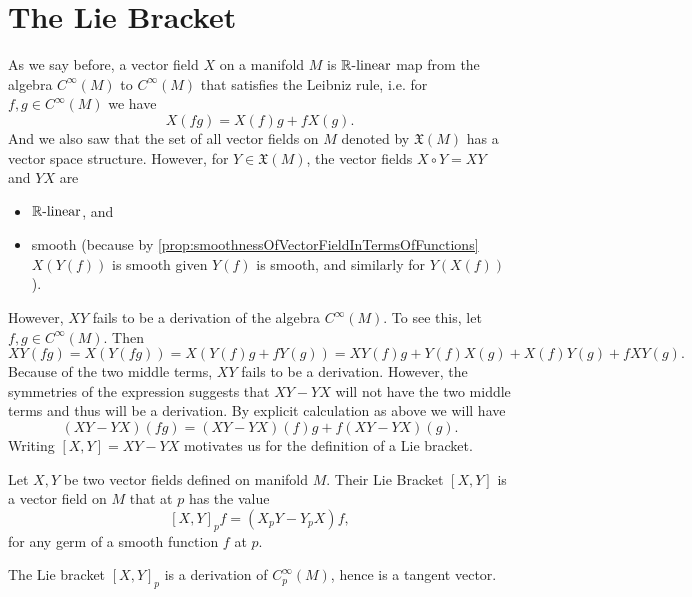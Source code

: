 \section{The Lie Bracket}
As we say before, a vector field $ X $ on a manifold $ M $ is $ \mathbb{R}\text{-linear} $ map from the algebra $ C^\infty(M) $ to $ C^\infty(M) $ that satisfies the Leibniz rule, i.e. for $ f,g \in C^\infty(M) $ we have
\[ X(fg) = X(f)g + fX(g). \]
And we also saw that the set of all vector fields on $  M $ denoted by $ \mathfrak{X}(M) $ has a vector space structure. However, for $ Y \in \mathfrak{X}(M) $, the vector fields $ X\circ Y  = XY $ and $ YX $ are
\begin{itemize}
	\item $ \mathbb{R}\text{-linear} $, and
	\item smooth (because by \autoref{prop:smoothnessOfVectorFieldInTermsOfFunctions} $ X(Y(f)) $ is smooth given $ Y(f) $ is smooth, and similarly for $ Y(X(f)) $).
\end{itemize}
However, $ XY $ fails to be a derivation of the algebra $ C^\infty(M) $. To see this, let $ f,g \in C^\infty (M) $. Then 
\[ XY(fg) = X(Y(fg)) = X(Y(f)g + fY(g)) = XY(f)g + Y(f)X(g) + X(f)Y(g) + fXY(g). \]
Because of the two middle terms, $ XY $ fails to be a derivation. However, the symmetries of the expression suggests that $ XY - YX $ will not have the two middle terms and thus will be a derivation. By explicit calculation as above we will have
\[ (XY - YX)(fg) = (XY - YX)(f) g + f(XY - YX)(g).  \]
Writing $ [X,Y] = XY - YX $ motivates us for the definition of a Lie bracket.

\begin{definition}
	Let $ X,Y $ be two vector fields defined on manifold $ M $. Their Lie Bracket $ [X,Y] $ is a vector field on $ M $ that at $ p $ has the value
	\[ [X,Y]_p f = (X_p Y - Y_p X)f, \]
	for any germ of a smooth function $ f $ at $ p $.
\end{definition}
\begin{remark}
	The Lie bracket $ [X,Y]_p $ is a derivation of $ C^\infty_p(M) $, hence is a tangent vector.
\end{remark}

